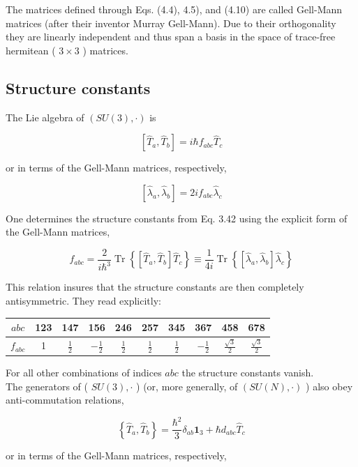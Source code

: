 \documentclass[10pt, letterpaper]{article}
\begin{document}
The matrices defined through Eqs. (4.4), 4.5), and (4.10) are called Gell-Mann matrices (after their inventor Murray Gell-Mann). Due to their orthogonality they are linearly independent and thus span a basis in the space of trace-free hermitean ( $3 \times 3$ ) matrices.

\subsection{Structure constants}
The Lie algebra of $(S U(3), \cdot)$ is

$$
\left[\hat{T}_{a}, \hat{T}_{b}\right]=i \hbar f_{a b c} \hat{T}_{c}
$$

or in terms of the Gell-Mann matrices, respectively,

$$
\left[\hat{\lambda}_{a}, \hat{\lambda}_{b}\right]=2 i f_{a b c} \hat{\lambda}_{c}
$$

One determines the structure constants from Eq. 3.42 using the explicit form of the Gell-Mann matrices,

$$
f_{a b c}=\frac{2}{i \hbar^{3}} \operatorname{Tr}\left\{\left[\hat{T}_{a}, \hat{T}_{b}\right] \hat{T}_{c}\right\} \equiv \frac{1}{4 i} \operatorname{Tr}\left\{\left[\hat{\lambda}_{a}, \hat{\lambda}_{b}\right] \hat{\lambda}_{c}\right\}
$$

This relation insures that the structure constants are then completely antisymmetric. They read explicitly:

\begin{center}
\begin{tabular}{c||c|c|c|c|c|c|c|c|c}
$a b c$ & 123 & 147 & 156 & 246 & 257 & 345 & 367 & 458 & 678 \\
\hline
$f_{a b c}$ & 1 & $\frac{1}{2}$ & $-\frac{1}{2}$ & $\frac{1}{2}$ & $\frac{1}{2}$ & $\frac{1}{2}$ & $-\frac{1}{2}$ & $\frac{\sqrt{3}}{2}$ & $\frac{\sqrt{3}}{2}$ \\
\hline
\end{tabular}
\end{center}

For all other combinations of indices $a b c$ the structure constants vanish.\\
The generators of ( $S U(3), \cdot$ ) (or, more generally, of $(S U(N), \cdot)$ ) also obey anti-commutation relations,

$$
\left\{\hat{T}_{a}, \hat{T}_{b}\right\}=\frac{\hbar^{2}}{3} \delta_{a b} \mathbf{1}_{3}+\hbar d_{a b c} \hat{T}_{c}
$$

or in terms of the Gell-Mann matrices, respectively,
\end{document}
